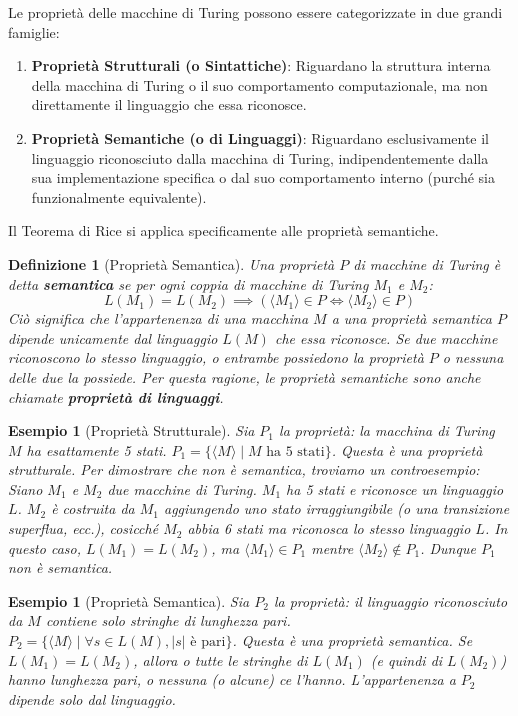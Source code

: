 \documentclass[a4paper, 11pt]{book} %
\newtheorem{definition}[theorem]{Definizione}
\newtheorem{example}[theorem]{Esempio}
\theoremstyle{definition}
\begin{document}
Le proprietà delle macchine di Turing possono essere categorizzate in due grandi famiglie:
\begin{enumerate}
    \item \textbf{Proprietà Strutturali (o Sintattiche)}: Riguardano la struttura interna della macchina di Turing o il suo comportamento computazionale, ma non direttamente il linguaggio che essa riconosce.
    \item \textbf{Proprietà Semantiche (o di Linguaggi)}: Riguardano esclusivamente il linguaggio riconosciuto dalla macchina di Turing, indipendentemente dalla sua implementazione specifica o dal suo comportamento interno (purché sia funzionalmente equivalente).
\end{enumerate}

Il Teorema di Rice si applica specificamente alle proprietà semantiche.

\begin{definition}[Proprietà Semantica]
Una proprietà $P$ di macchine di Turing è detta \textbf{semantica} se per ogni coppia di macchine di Turing $M_1$ e $M_2$:
\[ L(M_1) = L(M_2) \implies (\langle M_1 \rangle \in P \iff \langle M_2 \rangle \in P) \]
Ciò significa che l'appartenenza di una macchina $M$ a una proprietà semantica $P$ dipende unicamente dal linguaggio $L(M)$ che essa riconosce. Se due macchine riconoscono lo stesso linguaggio, o entrambe possiedono la proprietà $P$ o nessuna delle due la possiede. Per questa ragione, le proprietà semantiche sono anche chiamate \textbf{proprietà di linguaggi}.
\end{definition}

\begin{example}[Proprietà Strutturale]
Sia $P_1$ la proprietà: \textit{la macchina di Turing $M$ ha esattamente 5 stati}.
$P_1 = \{ \langle M \rangle \mid M \text{ ha 5 stati} \}$.
Questa è una proprietà strutturale. Per dimostrare che non è semantica, troviamo un controesempio:
Siano $M_1$ e $M_2$ due macchine di Turing. $M_1$ ha 5 stati e riconosce un linguaggio $L$. $M_2$ è costruita da $M_1$ aggiungendo uno stato irraggiungibile (o una transizione superflua, ecc.), cosicché $M_2$ abbia 6 stati ma riconosca lo stesso linguaggio $L$. In questo caso, $L(M_1) = L(M_2)$, ma $\langle M_1 \rangle \in P_1$ mentre $\langle M_2 \rangle \notin P_1$. Dunque $P_1$ non è semantica.
\end{example}

\begin{example}[Proprietà Semantica]
Sia $P_2$ la proprietà: \textit{il linguaggio riconosciuto da $M$ contiene solo stringhe di lunghezza pari}.
$P_2 = \{ \langle M \rangle \mid \forall s \in L(M), |s| \text{ è pari} \}$.
Questa è una proprietà semantica. Se $L(M_1) = L(M_2)$, allora o tutte le stringhe di $L(M_1)$ (e quindi di $L(M_2)$) hanno lunghezza pari, o nessuna (o alcune) ce l'hanno. L'appartenenza a $P_2$ dipende solo dal linguaggio.
\end{example}
\end{document}
